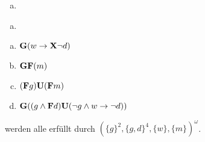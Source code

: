 


\date{Donnerstag 23.1.2020}


\maketitle
\thispagestyle{fancy}

\begin{enumerate}[a)]
	\item 
\end{enumerate}

\begin{enumerate}[a)]
	\item 
\end{enumerate}

\begin{enumerate}[(a)]
	\item $\mathbf{G}(w \to \mathbf{X}\lnot d)$ 
	\item $\mathbf{G}\mathbf{F}(m)$
	\item $(\mathbf{F} g)\mathbf{U} (\mathbf{F} m)$
	\item $ \mathbf{G}((g \land \mathbf{F} d)\mathbf{U}(\lnot g \land w \to \lnot d))$\\
\end{enumerate}

\noindent werden alle erfüllt durch $ (\{g\}^2,\{g,d\}^4,\{w\}, \{m\})^\omega $.


\vfill\centering

